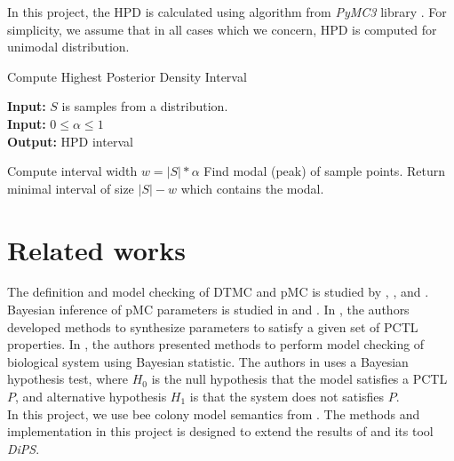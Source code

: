 \documentclass[12pt]{article}
\theoremstyle{definition}
\begin{document}
In this project, the HPD is calculated using algorithm from \textit{PyMC3}
library \cite{salvatier2016pymc3}. For simplicity, we assume that in all cases which we concern,
HPD is computed for unimodal distribution.
\begin{algorithm}[H]
  \caption{Compute Highest Posterior Density Interval}\label{mhalg}
  \hspace*{\algorithmicindent} \textbf{Input:} $S$ is samples from a distribution. \\
  \hspace*{\algorithmicindent} \textbf{Input:} $0\leq \alpha \leq 1$ \\
  \hspace*{\algorithmicindent} \textbf{Output:} HPD interval 
  \begin{algorithmic}[1]
    \State Compute interval width $w = |S| * \alpha$
    \State Find modal (peak) of sample points.
    \State Return minimal interval of size $|S| - w$ which contains the modal. 
    \EndProcedure
  \end{algorithmic}
\end{algorithm}


\section{Related works}
The definition and model checking of DTMC and pMC is studied by
\cite{baier2008principles}, \cite{hutschenreiter2017parametric}, and \cite{katoen2016probabilistic}.\\
Bayesian inference of pMC parameters is studied in \cite{polgreen2016data} and
\cite{jha2009bayesian}. In \cite{polgreen2016data}, the authors developed
methods to synthesize parameters to satisfy a given set of PCTL properties. In
\cite{jha2009bayesian}, the authors presented methods to perform model checking
of biological system using Bayesian statistic. The authors in
\cite{jha2009bayesian} uses a Bayesian hypothesis test, where $H_0$ is the null
hypothesis that the model satisfies a PCTL $P$, and alternative hypothesis $H_1$
is that the system does not satisfies $P$.\\
In this project, we use bee colony model semantics from \cite{hajnal2019data}.
The methods and implementation in this project is designed to extend the results
of \cite{hajnal2019data} and its tool \textit{DiPS}.

\end{document}
